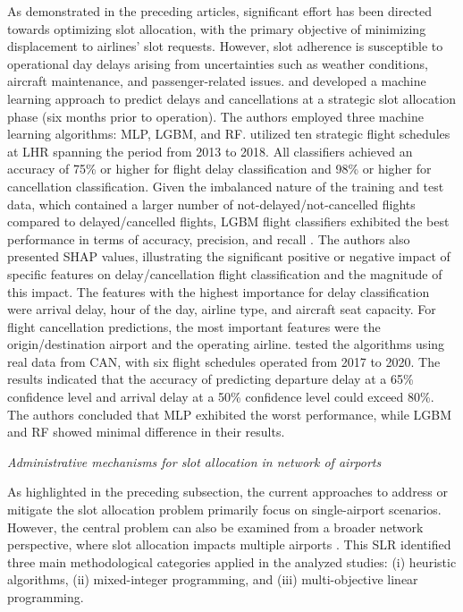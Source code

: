 As demonstrated in the preceding articles, significant effort has been directed towards optimizing slot allocation, with the primary objective of minimizing displacement to airlines’ slot requests. However, slot adherence is susceptible to operational day delays arising from uncertainties such as weather conditions, aircraft maintenance, and passenger-related issues.  and   developed a machine learning approach to predict delays and cancellations at a strategic slot allocation phase (six months prior to operation). The authors employed three machine learning algorithms: \acrfull{MLP}, \acrfull{LGBM}, and \acrfull{RF}.  utilized ten strategic flight schedules at \acrfull{LHR} spanning the period from 2013 to 2018. All classifiers achieved an accuracy of 75\% or higher for flight delay classification and 98\% or higher for cancellation classification. Given the imbalanced nature of the training and test data, which contained a larger number of not-delayed/not-cancelled flights compared to delayed/cancelled flights, \acrshort{LGBM} flight classifiers exhibited the best performance in terms of accuracy, precision, and recall \cite{lambelho_assessing_2020}. The authors also presented \acrfull{SHAP} values, illustrating the significant positive or negative impact of specific features on delay/cancellation flight classification and the magnitude of this impact. The features with the highest importance for delay classification were arrival delay, hour of the day, airline type, and aircraft seat capacity. For flight cancellation predictions, the most important features were the origin/destination airport and the operating airline.  tested the algorithms using real data from \acrfull{CAN}, with six flight schedules operated from 2017 to 2020. The results indicated that the accuracy of predicting departure delay at a 65\% confidence level and arrival delay at a 50\% confidence level could exceed 80\%. The authors concluded that \acrshort{MLP} exhibited the worst performance, while \acrshort{LGBM} and \acrshort{RF} showed minimal difference in their results.

\hfill \break
\textit{Administrative mechanisms for slot allocation in network of airports}
\hfill \break

As highlighted in the preceding subsection, the current approaches to address or mitigate the slot allocation problem primarily focus on single-airport scenarios. However, the central problem can also be examined from a broader network perspective, where slot allocation impacts multiple airports \cite{zografos2017increasing}. This \acrfull{SLR} identified three main methodological categories applied in the analyzed studies: (i) heuristic algorithms, (ii) mixed-integer programming, and (iii) multi-objective linear programming.


